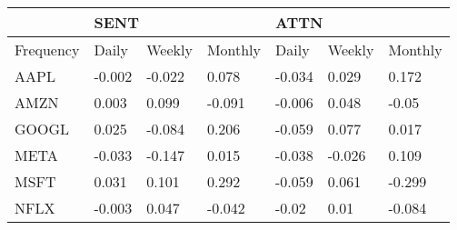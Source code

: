 \begin{tabular}{lllllll}
\toprule
{} & \multicolumn{3}{l}{SENT} & \multicolumn{3}{l}{ATTN} \\
\midrule
Frequency &  Daily &  Weekly &  Monthly &  Daily &  Weekly &  Monthly \\
AAPL      & -0.002 &  -0.022 &    0.078 & -0.034 &   0.029 &    0.172 \\
AMZN      &  0.003 &   0.099 &   -0.091 & -0.006 &   0.048 &    -0.05 \\
GOOGL     &  0.025 &  -0.084 &    0.206 & -0.059 &   0.077 &    0.017 \\
META      & -0.033 &  -0.147 &    0.015 & -0.038 &  -0.026 &    0.109 \\
MSFT      &  0.031 &   0.101 &    0.292 & -0.059 &   0.061 &   -0.299 \\
NFLX      & -0.003 &   0.047 &   -0.042 &  -0.02 &    0.01 &   -0.084 \\
\bottomrule
\end{tabular}
